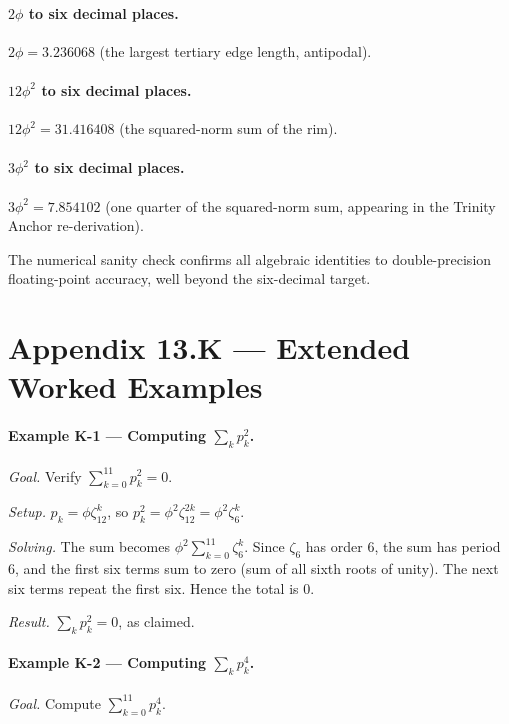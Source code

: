 \paragraph{$2\phi$ to six decimal places.}
$2\phi = 3.236068$ (the largest tertiary edge length, antipodal).

\paragraph{$12 \phi^{2}$ to six decimal places.}
$12 \phi^{2} = 31.416408$ (the squared-norm sum of the rim).

\paragraph{$3 \phi^{2}$ to six decimal places.}
$3 \phi^{2} = 7.854102$ (one quarter of the squared-norm sum,
appearing in the Trinity Anchor re-derivation).

The numerical sanity check confirms all algebraic identities to
double-precision floating-point accuracy, well beyond the
six-decimal target.

\section*{Appendix 13.K --- Extended Worked Examples}
\label{fa_13:sec:13-appK}

\paragraph{Example K-1 --- Computing $\sum_{k} p_{k}^{2}$.}
\emph{Goal.} Verify $\sum_{k=0}^{11} p_{k}^{2} = 0$.

\emph{Setup.} $p_{k} = \phi \zeta_{12}^{k}$, so $p_{k}^{2} =
\phi^{2} \zeta_{12}^{2k} = \phi^{2} \zeta_{6}^{k}$.

\emph{Solving.} The sum becomes
$\phi^{2} \sum_{k=0}^{11} \zeta_{6}^{k}$. Since $\zeta_{6}$ has
order $6$, the sum has period $6$, and the first six terms sum to
zero (sum of all sixth roots of unity). The next six terms repeat
the first six. Hence the total is $0$.

\emph{Result.} $\sum_{k} p_{k}^{2} = 0$, as claimed.

\paragraph{Example K-2 --- Computing $\sum_{k} p_{k}^{4}$.}
\emph{Goal.} Compute $\sum_{k=0}^{11} p_{k}^{4}$.

